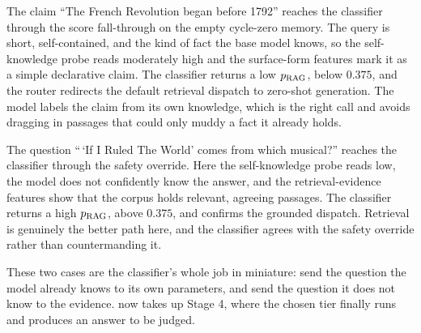 \begin{scenario}
The claim ``The French Revolution began before 1792'' reaches the classifier through the
score fall-through on the empty cycle-zero memory. The query is short, self-contained, and
the kind of fact the base model knows, so the self-knowledge probe reads moderately high
and the surface-form features mark it as a simple declarative claim. The classifier returns
a low $p_{\text{RAG}}$, below $0.375$, and the router redirects the default retrieval dispatch to
zero-shot generation. The model labels the claim from its own knowledge, which is the right
call and avoids dragging in passages that could only muddy a fact it already holds.
\end{scenario}

\begin{scenario}
The question ``\,`If I Ruled The World' comes from which musical?'' reaches the classifier
through the safety override. Here the self-knowledge probe reads low, the model does not
confidently know the answer, and the retrieval-evidence features show that the corpus holds
relevant, agreeing passages. The classifier returns a high $p_{\text{RAG}}$, above $0.375$, and
confirms the grounded dispatch. Retrieval is genuinely the better path here, and the
classifier agrees with the safety override rather than countermanding it.
\end{scenario}

These two cases are the classifier's whole job in miniature: send the question the model
already knows to its own parameters, and send the question it does not know to the
evidence.  now takes up Stage 4, where the chosen tier finally runs and
produces an answer to be judged.
